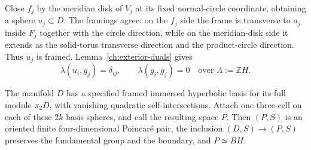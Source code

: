 Close $f_j$ by the meridian disk of $V_j$ at its fixed normal-circle
coordinate, obtaining a sphere $u_j\subset D$.  The framings agree:
on the $f_j$ side the frame is transverse to $a_j$ inside $F_j$
together with the circle direction, while on the meridian-disk
side it extends as the solid-torus transverse direction and the
product-circle direction.  Thus $u_j$ is framed.  Lemma~\ref{ch:exterior-duals}
gives
\begin{equation}
\label{ch:middle-pairings}
 \lambda(u_i,g_j)=\delta_{ij},\qquad
 \lambda(g_i,g_j)=0
 \quad\text{over }\Lambda:=\mathbb ZH.
\end{equation}

\begin{proposition}
\label{ch:poincare-chamber}
The manifold $D$ has a specified framed immersed hyperbolic basis
for its full module $\pi_2D$, with vanishing quadratic
self-intersections.  Attach one three-cell on each of these
$2k$ basis spheres, and call the resulting space $P$.  Then
$(P,S)$ is an oriented finite four-dimensional Poincar\'e pair,
the inclusion $(D,S)\to(P,S)$ preserves the fundamental group
and the boundary, and $P\simeq BH$.
\end{proposition}

